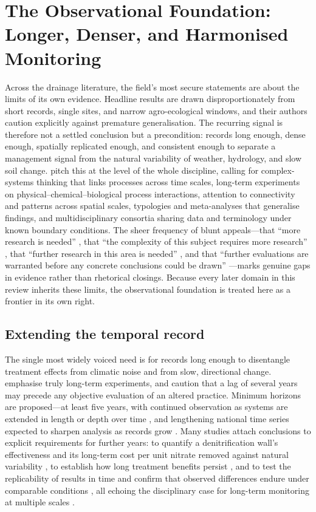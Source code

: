 \section{The Observational Foundation: Longer, Denser, and Harmonised Monitoring}

Across the drainage literature, the field's most secure statements are
about the limits of its own evidence. Headline results are drawn
disproportionately from short records, single sites, and narrow
agro-ecological windows, and their authors caution explicitly against
premature generalisation. The recurring signal is therefore not a settled
conclusion but a precondition: records long enough, dense enough,
spatially replicated enough, and consistent enough to separate a
management signal from the natural variability of weather, hydrology, and
slow soil change. \textcite{Rogger2017} pitch this at the level of the
whole discipline, calling for complex-systems thinking that links
processes across time scales, long-term experiments on
physical--chemical--biological process interactions, attention to
connectivity and patterns across spatial scales, typologies and
meta-analyses that generalise findings, and multidisciplinary consortia
sharing data and terminology under known boundary conditions. The sheer
frequency of blunt appeals---that ``more research is needed''
\parencite{SHALIT1995}, that ``the complexity of this subject requires more
research'' \parencite{Malone2014}, that ``further research in this area is
needed'' \parencite{Woo2023}, and that ``further evaluations are warranted
before any concrete conclusions could be drawn''
\parencite{GUPTA1993}---marks genuine gaps in evidence rather than
rhetorical closings. Because every later domain in this review inherits
these limits, the observational foundation is treated here as a frontier
in its own right.

\subsection{Extending the temporal record}

The single most widely voiced need is for records long enough to
disentangle treatment effects from climatic noise and from slow,
directional change. \textcite{Clifford2023} emphasise truly long-term
experiments, and \textcite{BUHLER1993} caution that a lag of several years
may precede any objective evaluation of an altered practice. Minimum
horizons are proposed---at least five years, with continued observation as
systems are extended in length or depth over time \parencite{Ali2013}, and
lengthening national time series expected to sharpen analysis as records
grow \parencite{Ali2001}. Many studies attach conclusions to explicit
requirements for further years: to quantify a denitrification wall's
effectiveness and its long-term cost per unit nitrate removed against
natural variability \parencite{Jaynes2008}, to establish how long treatment
benefits persist \parencite{Dalhem2019,Osterholm2005}, and to test the
replicability of results in time and confirm that observed differences
endure under comparable conditions
\parencite{ROLLIN1987,Reinhart2020,Rijal2012,GiménezValero2025}, all
echoing the disciplinary case for long-term monitoring at multiple scales
\parencite{SPALING1995}.

